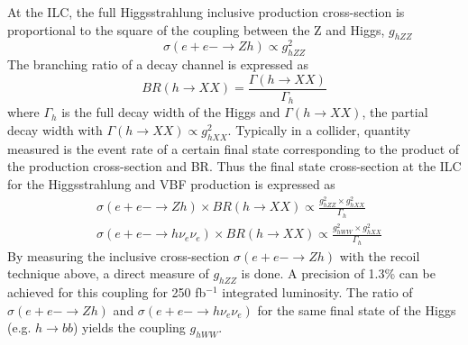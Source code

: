 At the ILC, the full Higgsstrahlung inclusive production cross-section is proportional to the square of the coupling between the Z and Higgs, $g_{hZZ}$
\begin{equation}
  \sigma(e+e- \rightarrow Zh) \propto g^2_{hZZ}
\end{equation}
The branching ratio of a decay channel is expressed as
\begin{equation}
  BR(h \rightarrow XX) = \frac{\Gamma(h \rightarrow XX)}{\Gamma_{h}}
\end{equation}
where $\Gamma_{h}$ is the full decay width of the Higgs and $\Gamma(h \rightarrow XX)$, the partial decay width with $\Gamma(h \rightarrow XX) \propto g^2_{hXX}$. Typically in a collider, quantity measured is the event rate of a certain final state corresponding to the product of the production cross-section and BR. Thus the final state cross-section at the ILC for the Higgsstrahlung and VBF production is expressed as
\begin{equation}
  \begin{aligned}
    &\sigma(e+e- \rightarrow Zh) \times BR(h \rightarrow XX) \propto \frac{g^2_{hZZ} \times g^2_{hXX}}{\Gamma_{h}}\\
    &\sigma(e+e- \rightarrow h\nu_e\nu_e) \times BR(h \rightarrow XX) \propto \frac{g^2_{hWW} \times g^2_{hXX}}{\Gamma_{h}}
  \end{aligned}
\end{equation}
By measuring the inclusive cross-section $\sigma(e+e- \rightarrow Zh)$ with the recoil technique above, a direct measure of $g_{hZZ}$ is done. A precision of 1.3\% can be achieved for this coupling for 250 fb$^{-1}$ integrated luminosity. The ratio of $\sigma(e+e- \rightarrow Zh)$ and $\sigma(e+e- \rightarrow h\nu_e\nu_e)$ for the same final state of the Higgs (e.g. $h \rightarrow bb$) yields the coupling $g_{hWW}$.

